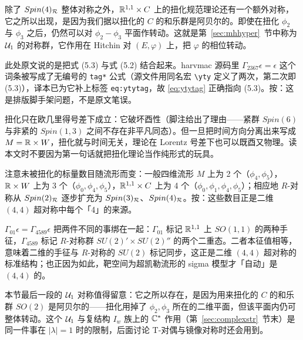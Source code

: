 除了 $Spin(4)_{\cal R}$ 整体对称之外，$\Bbb{R}^{1,1}\times C$ 上的扭化规范理论还有一个额外对称，它之所以出现，是因为我们据以扭化的 $C$ 的和乐群是阿贝尔的。即使在扭化 $\phi_2$ 与 $\phi_3$ 之后，仍然可以对 $\phi_2-\phi_3$ 平面作转动。这就是第~\ref{sec:mhhyper}~节中称为 ${\cal U}_1$ 的对称群，它作用在 Hitchin 对 $(E,\varphi)$ 上，把 $\varphi$ 的相位转动。

\begin{yizhu}[原文疑误]
此处原文说的是把式 (5.3) 与式 (5.2) 结合起来。harvmac 源码里 $\Gamma_{2367}\epsilon=\epsilon$ 这个词条被写成了无编号的 \texttt{tag*} 公式（源文件用同名宏 \verb|\yty| 定义了两次，第二次即 (5.3)），译本已为它补上标签 \texttt{eq:ytytag}，故 \eqref{eq:ytytag} 正确指向 (5.3)。按：这是排版脚手架问题，不是原文笔误。
\end{yizhu}

\begin{yizhu}[易错点]
扭化只在欧几里得号差下成立：它破坏酉性（脚注给出了理由——紧群 $Spin(6)$ 与非紧的 $Spin(1,3)$ 之间不存在非平凡同态）。但一旦把时间方向分离出来写成 $M=\Bbb{R}\times W$，扭化就与时间无关，理论在 Lorentz 号差下也可以既酉又物理。读本文时不要因为第一句话就把扭化理论当作纯形式的玩具。
\end{yizhu}

\begin{yizhu}[含糊点拨]
注意未被扭化的标量数目随流形而变：一般四维流形 $M$ 上为 2 个（$\phi_4,\phi_5$），$\Bbb{R}\times W$ 上为 3 个（$\phi_0,\phi_4,\phi_5$），$\Bbb{R}^{1,1}\times C$ 上为 4 个（$\phi_0,\phi_1,\phi_4,\phi_5$）；相应地 $R$-对称从 $Spin(2)_{\cal R}$ 逐步扩充为 $Spin(3)_{\cal R}$、$Spin(4)_{\cal R}$。按：这些数目正是二维 $(4,4)$ 超对称中每个「4」的来源。
\end{yizhu}

\begin{yizhu}[物理图像]
$\Gamma_{01}\epsilon=\Gamma_{4589}\epsilon$ 把两件不同的事绑在一起：$\Gamma_{01}$ 标记 $\Bbb{R}^{1,1}$ 上 $SO(1,1)$ 的两种手征，$\Gamma_{4589}$ 标记 $R$-对称群 $SU(2)'\times SU(2)''$ 的两个二重态。二者本征值相等，意味着二维的手征与 $R$-对称的 $SU(2)$ 标记同步，这正是二维 $(4,4)$ 超对称的标准结构；也正因为如此，靶空间为超凯勒流形的 sigma 模型才「自动」是 $(4,4)$ 的。
\end{yizhu}

\begin{yizhu}[含糊点拨]
本节最后一段的 ${\cal U}_1$ 对称值得留意：它之所以存在，是因为用来扭化的 $C$ 的和乐群 $SO(2)$ 是阿贝尔的——扭化用掉了 $\phi_2,\phi_3$ 所在的二维平面，但该平面内仍可整体转动。这个 ${\cal U}_1$ 与复结构 $I_w$ 族上的 $\Bbb{C}^*$ 作用（第~\ref{sec:complexstr}~节末）是同一件事在 $|\lambda|=1$ 时的限制，后面讨论 T-对偶与镜像对称时还会用到。
\end{yizhu}
